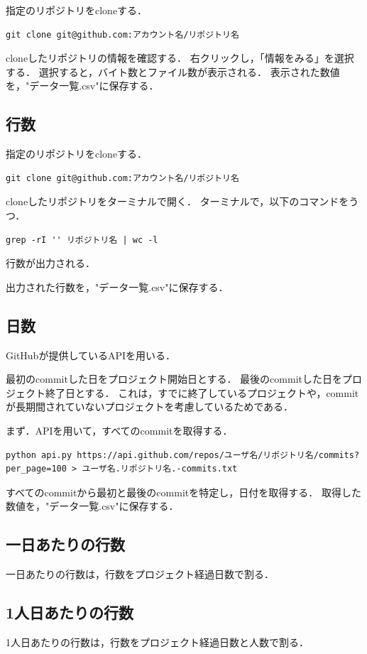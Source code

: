 指定のリポジトリをcloneする．
{
\small
\begin{verbatim}
git clone git@github.com:アカウント名/リポジトリ名
\end{verbatim}
}
cloneしたリポジトリの情報を確認する．
右クリックし，「情報をみる」を選択する．
選択すると，バイト数とファイル数が表示される．
表示された数値を，"データ一覧.csv"に保存する．


\subsection{行数}


指定のリポジトリをcloneする．
{
\small
\begin{verbatim}
git clone git@github.com:アカウント名/リポジトリ名
\end{verbatim}
}
cloneしたリポジトリをターミナルで開く．
ターミナルで，以下のコマンドをうつ．
{
\small
\begin{verbatim}
grep -rI '' リポジトリ名 | wc -l
\end{verbatim}
}
行数が出力される．

出力された行数を，"データ一覧.csv"に保存する．

\subsection{日数}

GitHubが提供しているAPIを用いる．

最初のcommitした日をプロジェクト開始日とする．
最後のcommitした日をプロジェクト終了日とする．
これは，すでに終了しているプロジェクトや，commitが長期間されていないプロジェクトを考慮しているためである．

まず．APIを用いて，すべてのcommitを取得する．
{
\small
\begin{verbatim}
python api.py https://api.github.com/repos/ユーザ名/リポジトリ名/commits?per_page=100 > ユーザ名.リポジトリ名.-commits.txt
\end{verbatim}
}
すべてのcommitから最初と最後のcommitを特定し，日付を取得する．
取得した数値を，"データ一覧.csv"に保存する．




\subsection{一日あたりの行数}
一日あたりの行数は，行数をプロジェクト経過日数で割る．
\subsection{1人日あたりの行数}
1人日あたりの行数は，行数をプロジェクト経過日数と人数で割る．

